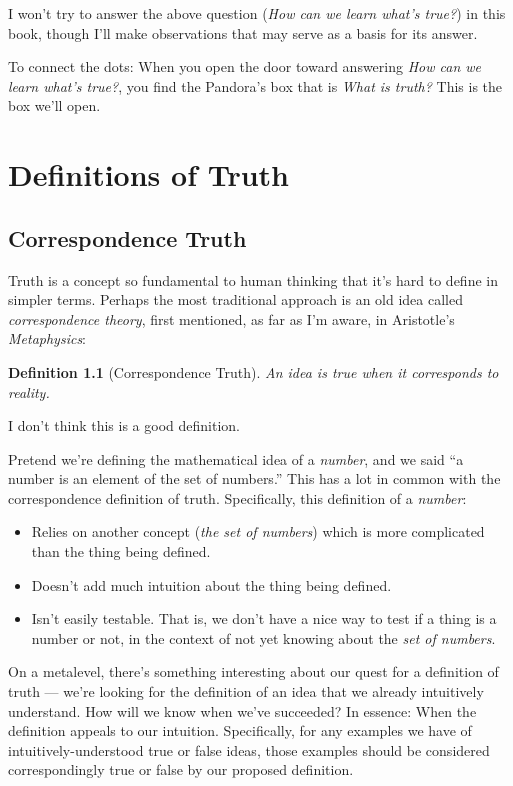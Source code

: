 \documentclass[9pt, twoside]{book}
\newtheorem*{defn}{Definition}
\theoremstyle{argtstyle}
\begin{document}
I won't try to answer the above question
({\em How can we learn what's true?}) in this book,
though I'll make observations that may serve
as a basis for its answer.

To connect the dots: When you open the door toward answering {\em How can we
learn what's true?}, you find the
Pandora's box that is {\em What is truth?} This is the box we'll open.

\chapter{Definitions of Truth}\label{s2}

\section{Correspondence Truth}

Truth is a concept so fundamental to human thinking that it's hard to define
in simpler terms.
Perhaps the most traditional approach is an old idea called
{\em correspondence theory}, first mentioned, as far
as I'm aware,
in Aristotle's {\em Metaphysics}\/:

\begin{defn}[Correspondence Truth]\label{d1}
    An idea is true when it corresponds to reality.
\end{defn}

I don't think this is a good definition.

Pretend we're defining the mathematical idea of a {\em number}, and we said
``a number is an element of the set of numbers.'' This 
has a lot in common with the correspondence definition of truth.
Specifically, this definition of a {\em number}:
\begin{itemize}
    \item Relies on another concept ({\em the set of numbers})
        which is more complicated than the thing
        being defined. 
    \item Doesn't add much intuition about the thing being defined.
    \item Isn't easily testable. That is, we don't have a nice
        way to test if a thing is a number or not, in the context of not yet
        knowing about the {\em set of numbers}.
\end{itemize}

On a metalevel, there's something interesting about our quest for a definition
of truth --- we're
looking for the definition of an idea that we already intuitively understand.
How will we know when we've succeeded?
In essence: When the definition
appeals to our intuition.
Specifically, for any examples we have of intuitively-understood true or false
ideas, those examples should be considered correspondingly true or false by our
proposed definition.
\end{document}
